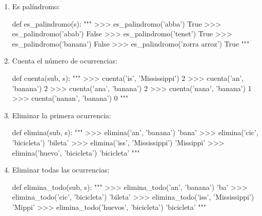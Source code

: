 \begin{enumerate}
\pagebreak

\item Es palíndromo:
\begin{pythoncode}
  def es_palindromo(s):
    """
      >>> es_palindromo('abba')
      True
      >>> es_palindromo('abab')
      False
      >>> es_palindromo('tenet')
      True
      >>> es_palindromo('banana')
      False
      >>> es_palindromo('zorra arroz')
      True
    """
\end{pythoncode}
\item Cuenta el número de ocurrencias:
\begin{pythoncode}
  def cuenta(sub, s):
    """
      >>> cuenta('is', 'Mississippi')
      2
      >>> cuenta('an', 'banana')
      2
      >>> cuenta('ana', 'banana')
      2
      >>> cuenta('nana', 'banana')
      1
      >>> cuenta('nanan', 'banana')
      0
    """
\end{pythoncode}

\pagebreak

\item Eliminar la primera ocurrencia: 
\begin{pythoncode}
  def elimina(sub, s):
    """
      >>> elimina('an', 'banana')
      'bana'
      >>> elimina('cic', 'bicicleta')
      'bileta'
      >>> elimina('iss', 'Mississippi')
      'Missippi'
      >>> elimina('huevo', 'bicicleta')
      'bicicleta'
    """
\end{pythoncode}
\item Eliminar todas las ocurrencias:
\begin{pythoncode}
  def elimina_todo(sub, s):
    """
      >>> elimina_todo('an', 'banana')
      'ba'
      >>> elimina_todo('cic', 'bicicleta')
      'bileta'
      >>> elimina_todo('iss', 'Mississippi')
      'Mippi'
      >>> elimina_todo('huevos', 'bicicleta')
      'bicicleta'
    """
\end{pythoncode}
\end{enumerate}

